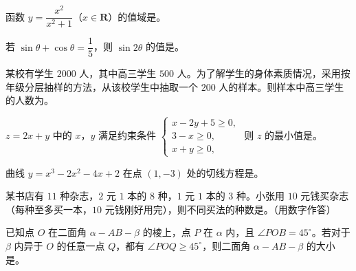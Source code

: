 \begin{question}
函数 $y=\dfrac{x^2}{x^2+1}$（$x\in\mathbf R$）的值域是\gkblank{}。

\end{question}
\begin{question}
若 $\sin\theta+\cos\theta=\dfrac15$，则 $\sin2\theta$ 的值是\gkblank{}。

\end{question}
\begin{question}
某校有学生 $2000$ 人，其中高三学生 $500$ 人。为了解学生的身体素质情况，采用按年级分层抽样的方法，从该校学生中抽取一个 $200$ 人的样本。则样本中高三学生的人数为\gkblank{}。

\end{question}
\begin{question}
$z=2x+y$ 中的 $x$，$y$ 满足约束条件 $\begin{cases}x-2y+5\geqslant0,\\ 3-x\geqslant0,\\ x+y\geqslant0,\end{cases}$ 则 $z$ 的最小值是\gkblank{}。

\end{question}
\begin{question}
曲线 $y=x^3-2x^2-4x+2$ 在点 $(1,-3)$ 处的切线方程是\gkblank{}。

\end{question}
\begin{question}
某书店有 $11$ 种杂志，$2$ 元 $1$ 本的 $8$ 种，$1$ 元 $1$ 本的 $3$ 种。小张用 $10$ 元钱买杂志（每种至多买一本，$10$ 元钱刚好用完），则不同买法的种数是\gkblank{}。（用数字作答）

\end{question}
\begin{question}
已知点 $O$ 在二面角 $\alpha-AB-\beta$ 的棱上，点 $P$ 在 $\alpha$ 内，且 $\angle POB=45^\circ$。若对于 $\beta$ 内异于 $O$ 的任意一点 $Q$，都有 $\angle POQ\geqslant45^\circ$，则二面角 $\alpha-AB-\beta$ 的大小是\gkblank{}。

\end{question}

